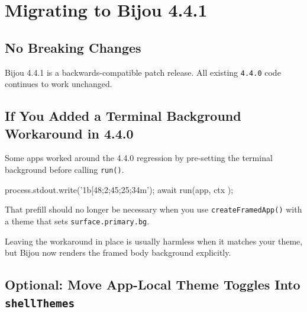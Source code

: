 \chapter{Migrating to Bijou 4.4.1}\label{record-268}

\smallskip

\section{No Breaking Changes}\label{record-268-no-breaking-changes}

Bijou 4.4.1 is a backwards-compatible patch release. All existing \texttt{4\allowbreak{}.\allowbreak{}4\allowbreak{}.\allowbreak{}0} code continues to work unchanged.

\section{If You Added a Terminal Background Workaround in 4.4.0}\label{record-268-if-you-added-a-terminal-background-workaround-in-4.4.0}

Some apps worked around the 4.4.0 regression by pre-setting the terminal background before calling \texttt{r\allowbreak{}u\allowbreak{}n\allowbreak{}(\allowbreak{})}.

\begin{CodeBlock}
process.stdout.write('\x1b[48;2;45;25;34m');
await run(app, { ctx });
\end{CodeBlock}

That prefill should no longer be necessary when you use \texttt{c\allowbreak{}r\allowbreak{}e\allowbreak{}a\allowbreak{}t\allowbreak{}e\allowbreak{}F\allowbreak{}r\allowbreak{}a\allowbreak{}m\allowbreak{}e\allowbreak{}d\allowbreak{}A\allowbreak{}p\allowbreak{}p\allowbreak{}(\allowbreak{})} with a theme that sets \texttt{s\allowbreak{}u\allowbreak{}r\allowbreak{}f\allowbreak{}a\allowbreak{}c\allowbreak{}e\allowbreak{}.\allowbreak{}p\allowbreak{}r\allowbreak{}i\allowbreak{}m\allowbreak{}a\allowbreak{}r\allowbreak{}y\allowbreak{}.\allowbreak{}b\allowbreak{}g}.

Leaving the workaround in place is usually harmless when it matches your theme, but Bijou now renders the framed body background explicitly.

\section{\texorpdfstring{Optional: Move App-Local Theme Toggles Into \texttt{s\allowbreak{}h\allowbreak{}e\allowbreak{}l\allowbreak{}l\allowbreak{}T\allowbreak{}h\allowbreak{}e\allowbreak{}m\allowbreak{}e\allowbreak{}s}}{Optional: Move App-Local Theme Toggles Into }}\label{record-268-optional-move-app-local-theme-toggles-into-shellthemes}

